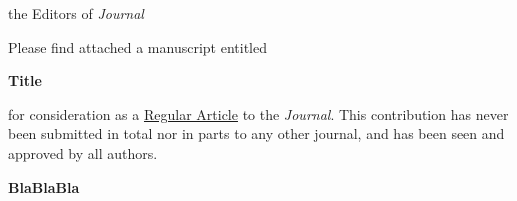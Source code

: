 \documentclass[10pt]{uhhlet}
\newcommand{\journal}{Journal}
\newcommand{\papertitle}{Title}
\begin{document}
\UKvardate\renewcommand{\headrulewidth}{0pt}

\renewcommand{\yoursdetails}{Yours sincerely, the authors}

\begin{letter}%
{the Editors of \textit{\journal{}}}


\vspace{-1em}
\justifying
Please find attached a manuscript entitled 
\vspace{-1.25em}
\begin{center}
\textbf{\papertitle{}}
\end{center}
\vspace{-1.25em}
for consideration as a \underline{Regular Article} to the \textit{\journal}. 
This contribution has never been submitted in total nor in parts to any other journal, and has been seen and approved by all authors.

\textbf{BlaBlaBla}
\end{letter}
\end{document}
